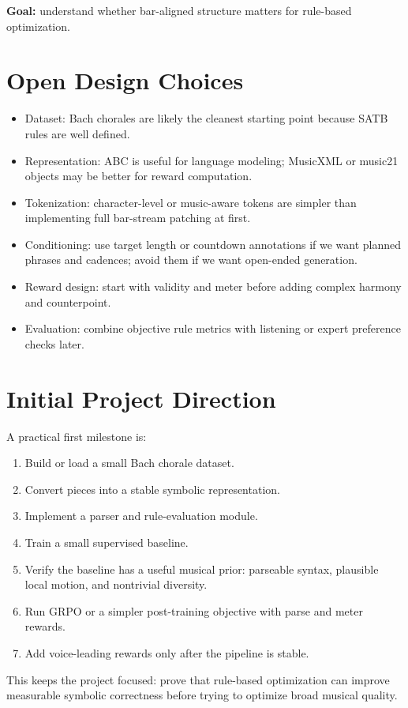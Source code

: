 \documentclass[11pt]{article}
\begin{document}
\textbf{Goal:} understand whether bar-aligned structure matters for rule-based
optimization.

\section{Open Design Choices}
\label{sec:design}

\begin{itemize}[leftmargin=*]
  \item Dataset: Bach chorales are likely the cleanest starting point because
  SATB rules are well defined.
  \item Representation: ABC is useful for language modeling; MusicXML or
  music21 objects may be better for reward computation.
  \item Tokenization: character-level or music-aware tokens are simpler than
  implementing full bar-stream patching at first.
  \item Conditioning: use target length or countdown annotations if we want
  planned phrases and cadences; avoid them if we want open-ended generation.
  \item Reward design: start with validity and meter before adding complex
  harmony and counterpoint.
  \item Evaluation: combine objective rule metrics with listening or expert
  preference checks later.
\end{itemize}

\section{Initial Project Direction}
\label{sec:initial-direction}

A practical first milestone is:

\begin{enumerate}[leftmargin=*]
  \item Build or load a small Bach chorale dataset.
  \item Convert pieces into a stable symbolic representation.
  \item Implement a parser and rule-evaluation module.
  \item Train a small supervised baseline.
  \item Verify the baseline has a useful musical prior: parseable syntax,
  plausible local motion, and nontrivial diversity.
  \item Run GRPO or a simpler post-training objective with parse and meter
  rewards.
  \item Add voice-leading rewards only after the pipeline is stable.
\end{enumerate}

This keeps the project focused: prove that rule-based optimization can improve
measurable symbolic correctness before trying to optimize broad musical quality.
\end{document}
